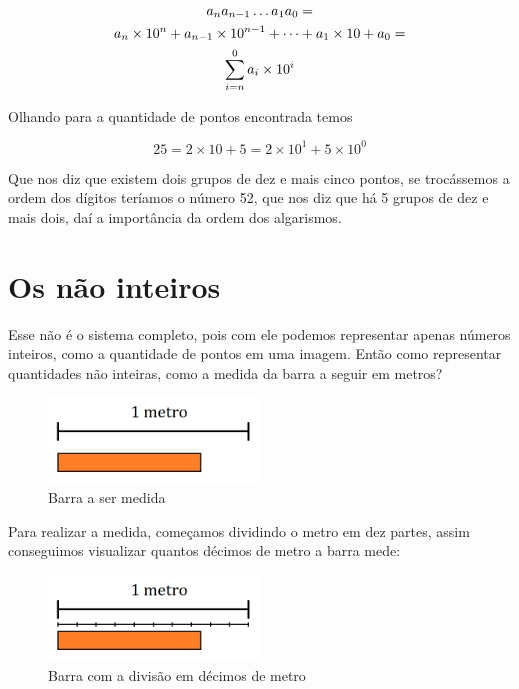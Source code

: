 \documentclass{report}
\theoremstyle{definition}
\begin{document}
\begin{gather}
a_{n}a_{n-1} \ldots a_{1}a_{0} = \notag\\
a_{n} \times 10^{n} + a_{n-1} \times 10^{n-1} + \cdots + a_{1} \times 10 + a_{0} = \notag\\
\sum_{i=n}^{0}a_i \times 10^i
\end{gather}

Olhando para a quantidade de pontos encontrada temos

\begin{equation*}
25 = 2 \times 10 + 5 = 2 \times 10^1 + 5 \times 10^0
\end{equation*}

Que nos diz que existem dois grupos de dez e mais cinco pontos, se trocássemos a ordem dos dígitos teríamos o número 52, que nos diz que há 5 grupos de dez e mais dois, daí a importância da ordem dos algarismos.
\section{Os não inteiros}

Esse não é o sistema completo, pois com ele podemos representar apenas números inteiros, como a quantidade de pontos em uma imagem. Então como representar quantidades não inteiras, como a medida da barra a seguir em metros?

\begin{figure}[H]
    \centering
    \includegraphics[width=0.5\textwidth]{imgs/barra_1.png}
    \caption{Barra a ser medida}
\end{figure}

Para realizar a medida, começamos dividindo o metro em dez partes, assim conseguimos visualizar quantos décimos de metro a barra mede:

\begin{figure}[H]
    \centering
    \includegraphics[width=0.5\textwidth]{imgs/barra_2.png}
    \caption{Barra com a divisão em décimos de metro}
\end{figure}
\end{document}
